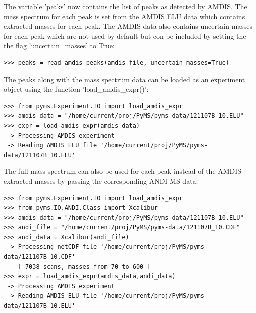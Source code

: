 \noindent
The variable 'peaks' now contains the list of peaks as detected by AMDIS.  The mass
spectrum for each peak is set from the AMDIS ELU data which contains extracted masses
for each peak. The AMDIS data also contains uncertain masses for each peak which are
not used by default but con be included by setting the the flag 'uncertain\_masses'
to True:

\begin{verbatim}
>>> peaks = read_amdis_peaks(amdis_file, uncertain_masses=True)
\end{verbatim}

The peaks along with the mass spectrum data can be loaded as an experiment
object using the function 'load\_amdis\_expr()':

\begin{verbatim}
>>> from pyms.Experiment.IO import load_amdis_expr
>>> amdis_data = "/home/current/proj/PyMS/pyms-data/121107B_10.ELU"
>>> expr = load_amdis_expr(amdis_data)
 -> Processing AMDIS experiment
 -> Reading AMDIS ELU file '/home/current/proj/PyMS/pyms-data/121107B_10.ELU'
\end{verbatim}

The full mass spectrum can also be used for each peak instead of the AMDIS extracted masses
by passing the corresponding ANDI-MS data:

\begin{verbatim}
>>> from pyms.Experiment.IO import load_amdis_expr
>>> from pyms.IO.ANDI.Class import Xcalibur
>>> amdis_data = "/home/current/proj/PyMS/pyms-data/121107B_10.ELU"
>>> andi_file = "/home/current/proj/PyMS/pyms-data/121107B_10.CDF"
>>> andi_data = Xcalibur(andi_file)
 -> Processing netCDF file '/home/current/proj/PyMS/pyms-data/121107B_10.CDF'
    [ 7038 scans, masses from 70 to 600 ]
>>> expr = load_amdis_expr(amdis_data,andi_data)
 -> Processing AMDIS experiment
 -> Reading AMDIS ELU file '/home/current/proj/PyMS/pyms-data/121107B_10.ELU'
\end{verbatim}
